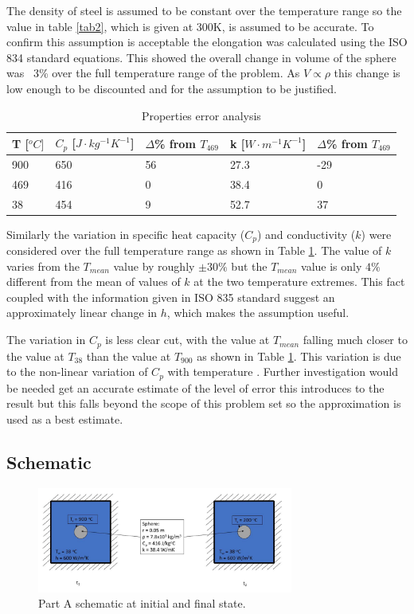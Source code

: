 \documentclass[11pt]{article}
\begin{document}
The density of steel is assumed to be constant over the temperature range so the value in table \ref{tab2}, which is given at 300K, is assumed to be accurate. To confirm this assumption is acceptable the elongation was calculated using the ISO 834 standard equations\cite{jean-marc_franssen_fire_2015}. This showed the overall change in volume of the sphere was ~3\% over the full temperature range of the problem. As $V \propto \rho$ this change is low enough to be discounted and for the assumption to be justified.

\begin{table}[h]
	\centering
	\caption{Properties error analysis}
	\begin{tabular}{lllll}
		T [$^{o}C]$ & $C_{p}$ [$J \cdot kg^{-1}K^{-1}$] & $\Delta$\% from $T_{469}$ & k [$W \cdot m^{-1}K^{-1}$] & $\Delta$\% from $T_{469}$ \\ \hline
		900 & 650 & 56 & 27.3 & -29 \\
		469 & 416 & 0 & 38.4 & 0 \\
		38 & 454 & 9 & 52.7 & 37
	\end{tabular}
	\label{tab3}
\end{table}

Similarly the variation in specific heat capacity ($C_p$) and conductivity ($k$) were considered over the full temperature range as shown in Table \ref{tab3}. The value of $k$ varies from the $T_{mean}$ value by roughly $\pm 30\%$  but the $T_{mean}$ value is only $4\%$ different from the mean of values of $k$ at the two temperature extremes. This fact coupled with the information given in ISO 835 standard \cite{jean-marc_franssen_fire_2015} suggest an approximately linear change in $h$, which makes the assumption useful. 

The variation in $C_p$ is less clear cut, with the value at $T_{mean}$ falling much closer to the value at $T_{38}$ than the value at $T_{900}$ as shown in Table \ref{tab3}. This variation is due to the non-linear variation of $C_p$ with temperature \cite{jean-marc_franssen_fire_2015}. Further investigation would be needed get an accurate estimate of the level of error this introduces to the result but this falls beyond the scope of this problem set so the approximation is used as a best estimate.

\subsection{Schematic}
\begin{figure}[!htbp]
	\centering
	\includegraphics[width=0.75\textwidth]{part_a_fig}
	\caption{Part A schematic at initial and final state.}
	\label{fig:schem_a}
\end{figure}
\FloatBarrier
\end{document}
